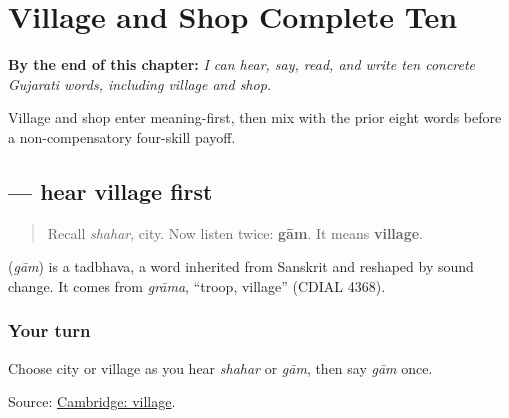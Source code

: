 
\chapter{Village and Shop Complete Ten}
\label{ch:gu-village-shop-ten}

\begin{chapteropening}
\textbf{By the end of this chapter:} \emph{I can hear, say, read, and write ten concrete Gujarati words, including village and shop.}

Village and shop enter meaning-first, then mix with the prior eight words before a non-compensatory four-skill payoff.
\end{chapteropening}

\section[\texorpdfstring{\gu{ગામ} (gām)}{ગામ (gām)}]{ — hear village first}

\label{lesson:GU-C23-hear-gaam}



\begin{quote}
Recall \emph{shahar}, city. Now listen twice: \textbf{gām}. It means \textbf{village}.
\end{quote}

\begin{cousinweb}
\textbf{} (\emph{gām}) is a tadbhava, a word inherited from Sanskrit and reshaped by sound change. It comes from \emph{grāma}, \textquotedblleft{}troop, village\textquotedblright{} (CDIAL 4368).
\end{cousinweb}

\subsection*{Your turn}
Choose city or village as you hear \emph{shahar} or \emph{gām}, then say \emph{gām} once.

\begin{tcolorbox}[breakable,colback=teal!4,colframe=teal!35!black,title={Before you move on}]
Source: \href{https://dictionary.cambridge.org/dictionary/english-gujarati/village}{Cambridge: village}.
\end{tcolorbox}
